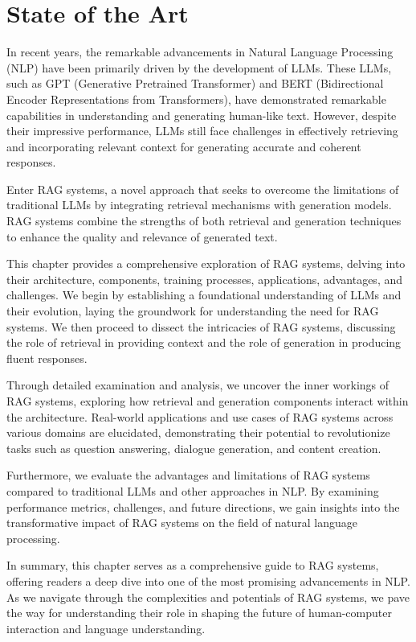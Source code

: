 \chapter{State of the Art}
\graphicspath{{state-of-the-art/figures/}}

In recent years, the remarkable advancements in Natural Language Processing (NLP) have been primarily driven by the development of LLMs. These LLMs, such as GPT (Generative Pretrained Transformer)\cite{openai:gpt} and BERT (Bidirectional Encoder Representations from Transformers)\cite{devlin2019bert}, have demonstrated remarkable capabilities in understanding and generating human-like text. However, despite their impressive performance, LLMs still face challenges in effectively retrieving and incorporating relevant context for generating accurate and coherent responses.

Enter RAG systems, a novel approach that seeks to overcome the limitations of traditional LLMs by integrating retrieval mechanisms with generation models. RAG systems combine the strengths of both retrieval and generation techniques to enhance the quality and relevance of generated text.

This chapter provides a comprehensive exploration of RAG systems, delving into their architecture, components, training processes, applications, advantages, and challenges. We begin by establishing a foundational understanding of LLMs and their evolution, laying the groundwork for understanding the need for RAG systems. We then proceed to dissect the intricacies of RAG systems, discussing the role of retrieval in providing context and the role of generation in producing fluent responses.

Through detailed examination and analysis, we uncover the inner workings of RAG systems, exploring how retrieval and generation components interact within the architecture. Real-world applications and use cases of RAG systems across various domains are elucidated, demonstrating their potential to revolutionize tasks such as question answering, dialogue generation, and content creation.

Furthermore, we evaluate the advantages and limitations of RAG systems compared to traditional LLMs and other approaches in NLP. By examining performance metrics, challenges, and future directions, we gain insights into the transformative impact of RAG systems on the field of natural language processing.

In summary, this chapter serves as a comprehensive guide to RAG systems, offering readers a deep dive into one of the most promising advancements in NLP. As we navigate through the complexities and potentials of RAG systems, we pave the way for understanding their role in shaping the future of human-computer interaction and language understanding.

